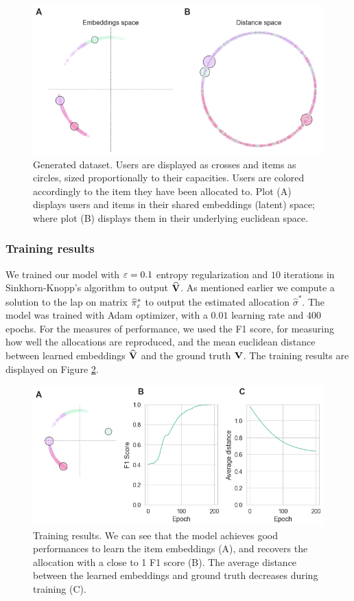 \begin{figure}[h]
    \centering
    \includegraphics[width=.9\columnwidth]{images/simca/dataset.png}
    \caption{Generated dataset. Users are displayed as crosses and items as circles, sized proportionally to their capacities. Users are colored accordingly to the item they have been allocated to. Plot (A) displays users and items in their shared embeddings (latent) space; where plot (B) displays them in their underlying euclidean space.}
    \label{fig:toy_dataset}
\end{figure}

\subsubsection*{Training results}
We trained our model with $\varepsilon=0.1$ entropy regularization and $10$ iterations in Sinkhorn-Knopp's algorithm to output $\widehat{\mathbf{V}}$. As mentioned earlier we compute a solution to the \ac{lap} on matrix $\widehat{\pi}^*_{\varepsilon}$ to output the estimated allocation $\widehat{\sigma}^*$. The model was trained with Adam optimizer, with a $0.01$ learning rate and $400$ epochs. For the measures of performance, we used the F1 score, for measuring how well the allocations are reproduced, and the mean euclidean distance between learned embeddings $\widehat{\mathbf{V}}$ and the ground truth $\mathbf{V}$. The training results are displayed on Figure \ref{fig:learned_embeddings}.

\begin{figure}[h]
    \centering
    \includegraphics[width=.9\columnwidth]{images/simca/learned_embeddings.png}
    \caption{
        Training results. We can see that the model achieves good performances to learn the item embeddings (A), and recovers the allocation with a close to 1 F1 score (B). The average distance between the learned embeddings and ground truth decreases during training (C).
    }
    \label{fig:learned_embeddings}
\end{figure}

